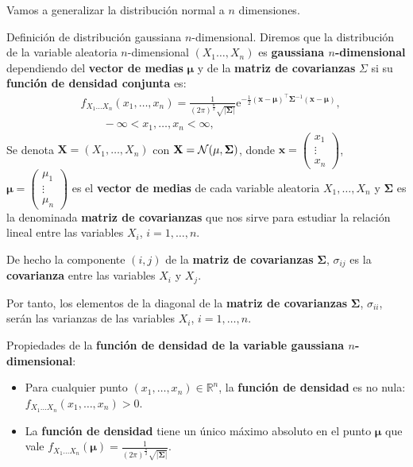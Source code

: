 \documentclass[]{book}
\begin{document}
Vamos a generalizar la distribución normal a \(n\) dimensiones.

Definición de distribución gaussiana \(n\)-dimensional.
Diremos que la distribución de la variable aleatoria \(n\)-dimensional \((X_1\ldots,X_n)\) es \textbf{gaussiana \(n\)-dimensional} dependiendo del \textbf{vector de medias} \(\mathbf{\mu}\) y de la \textbf{matriz de covarianzas} \(\Sigma\) si su \textbf{función de densidad conjunta} es:
\[
\begin{array}{rl}
& f_{X_1\ldots X_n}(x_1,\ldots,x_n)=\frac{1}{(2\pi)^{\frac{n}{2}}\sqrt{\mathbf{|\Sigma|}}}\mathrm{e}^{-\frac{1}{2}(\mathbf{x-\mu})^\top\mathbf{\Sigma}^{-1}(\mathbf{x-\mu})},\\ & \qquad  -\infty <x_1,\ldots,x_n<\infty,
\end{array}
\]
Se denota \(\mathbf{X}=(X_1,\ldots,X_n)\) con \(\mathbf{X}={\cal N}(\mathbf{\mu},\mathbf{\Sigma})\), donde \(\mathbf{x}=\begin{pmatrix}x_1\\\vdots\\ x_n\end{pmatrix}\), \(\mathbf{\mu}=\begin{pmatrix}\mu_1\\\vdots\\ \mu_n\end{pmatrix}\) es el \textbf{vector de medias} de cada variable aleatoria \(X_1,\ldots, X_n\) y \(\mathbf{\Sigma}\) es la denominada \textbf{matriz de covarianzas} que nos sirve para estudiar la relación lineal entre las variables \(X_i\), \(i=1,\ldots, n\).

De hecho la componente \((i,j)\) de la \textbf{matriz de covarianzas} \(\mathbf{\Sigma}\), \(\sigma_{ij}\) es la \textbf{covarianza} entre las variables \(X_i\) y \(X_j\).

Por tanto, los elementos de la diagonal de la \textbf{matriz de covarianzas} \(\mathbf{\Sigma}\), \(\sigma_{ii}\), serán las varianzas de las variables \(X_i\), \(i=1,\ldots,n\).

Propiedades de la \textbf{función de densidad de la variable gaussiana \(n\)-dimensional}:

\begin{itemize}
\item
  Para cualquier punto \((x_1,\ldots,x_n)\in\mathbb{R}^n\), la \textbf{función de densidad} es no nula: \(f_{X_1\ldots X_n}(x_1,\ldots,x_n)>0\).
\item
  La \textbf{función de densidad} tiene un único máximo absoluto en el punto \(\mathbf{\mu}\) que vale \(f_{X_1\ldots X_n}(\mathbf{\mu})=\frac{1}{(2\pi)^{\frac{n}{2}}\sqrt{\mathbf{|\Sigma|}}}\).
\end{itemize}
\end{document}
